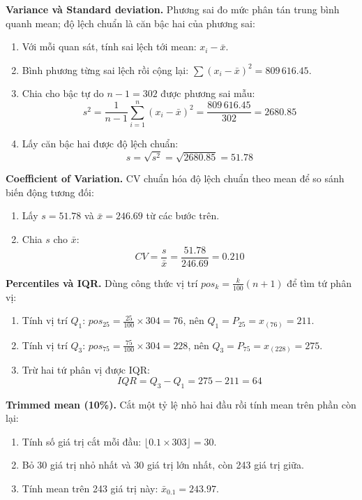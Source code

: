 \noindent\textbf{Variance và Standard deviation.} Phương sai đo mức phân tán trung bình quanh mean; độ lệch chuẩn là căn bậc hai của phương sai:
\begin{enumerate}[leftmargin=2.2em,label=\textbf{\arabic*.}]
 \item Với mỗi quan sát, tính sai lệch tới mean: $x_i-\bar{x}$.
 \item Bình phương từng sai lệch rồi cộng lại: $\sum(x_i-\bar{x})^2 = 809\,616.45$.
 \item Chia cho bậc tự do $n-1=302$ được phương sai mẫu:
 \begin{equation}
 s^2 = \frac{1}{n-1}\sum_{i=1}^{n}(x_i-\bar{x})^2 = \frac{809\,616.45}{302} = 2680.85
 \end{equation}
 \item Lấy căn bậc hai được độ lệch chuẩn:
 \begin{equation}
 s = \sqrt{s^2}=\sqrt{2680.85}=51.78
 \end{equation}
\end{enumerate}

\noindent\textbf{Coefficient of Variation.} CV chuẩn hóa độ lệch chuẩn theo mean để so sánh biến động tương đối:
\begin{enumerate}[leftmargin=2.2em,label=\textbf{\arabic*.}]
 \item Lấy $s=51.78$ và $\bar{x}=246.69$ từ các bước trên.
 \item Chia $s$ cho $\bar{x}$:
 \begin{equation}
 CV = \frac{s}{\bar{x}}=\frac{51.78}{246.69}=0.210
 \end{equation}
\end{enumerate}

\noindent\textbf{Percentiles và IQR.} Dùng công thức vị trí $pos_k=\tfrac{k}{100}(n+1)$ để tìm tứ phân vị:
\begin{enumerate}[leftmargin=2.2em,label=\textbf{\arabic*.}]
 \item Tính vị trí $Q_1$: $pos_{25}=\tfrac{25}{100}\times304=76$, nên $Q_1=P_{25}=x_{(76)}=211$.
 \item Tính vị trí $Q_3$: $pos_{75}=\tfrac{75}{100}\times304=228$, nên $Q_3=P_{75}=x_{(228)}=275$.
 \item Trừ hai tứ phân vị được IQR:
 \begin{equation}
 IQR = Q_3-Q_1 = 275-211 = 64
 \end{equation}
\end{enumerate}

\noindent\textbf{Trimmed mean (10\%).} Cắt một tỷ lệ nhỏ hai đầu rồi tính mean trên phần còn lại:
\begin{enumerate}[leftmargin=2.2em,label=\textbf{\arabic*.}]
 \item Tính số giá trị cắt mỗi đầu: $\lfloor 0.1\times303\rfloor=30$.
 \item Bỏ 30 giá trị nhỏ nhất và 30 giá trị lớn nhất, còn 243 giá trị giữa.
 \item Tính mean trên 243 giá trị này: $\bar{x}_{0.1}=243.97$.
\end{enumerate}

